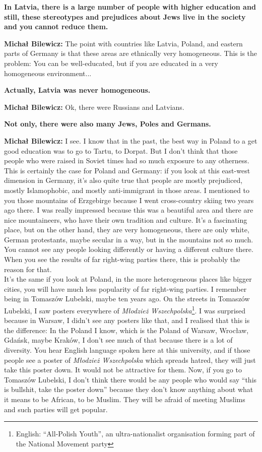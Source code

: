 \textbf{In Latvia, there is a large number of people with higher education and still, these stereotypes and prejudices about Jews live in the society and you cannot reduce them.} 

\textbf{Michał Bilewicz:} The point with countries like Latvia, Poland, and eastern parts of Germany is that these areas are ethnically very homogeneous. This is the problem: You can be well-educated, but if you are educated in a very homogeneous environment...

\textbf{Actually, Latvia was never homogeneous.}

\textbf{Michał Bilewicz:} Ok, there were Russians and Latvians.

\textbf{Not only, there were also many Jews, Poles and Germans.}

\textbf{Michał Bilewicz:} I see. I know that in the past, the best way in Poland to a get good education was to go to Tartu, to Dorpat. But I don’t think that those people who were raised in Soviet times had so much exposure to any otherness. This is certainly the case for Poland and Germany: if you look at this east-west dimension in Germany, it’s also quite true that people are mostly prejudiced, mostly Islamophobic, and mostly anti-immigrant in those areas. I mentioned to you those mountains of Erzgebirge because I went cross-country skiing two years ago there. I was really impressed because this was a beautiful area and there are nice mountaineers, who have their own tradition and culture. It’s a fascinating place, but on the other hand, they are very homogeneous, there are only white, German protestants, maybe secular in a way, but in the mountains not so much. You cannot see any people looking differently or having a different culture there. When you see the results of far right-wing parties there, this is probably the reason for that.\\
It's the same if you look at Poland, in the more heterogeneous places like bigger cities, you will have much less popularity of far right-wing parties. I remember being in Tomaszów Lubelski, maybe ten years ago. On the streets in Tomaszów Lubelski, I saw posters everywhere of \textit{Młodzież Wszechpolska}\footnote{English: ``All-Polish Youth'', an ultra-nationalist organisation forming part of the National Movement party}. I was surprised because in Warsaw, I didn’t see any posters like that, and I realised that this is the difference: In the Poland I know, which is the Poland of Warsaw, Wrocław, Gdańsk, maybe Kraków, I don’t see much of that because there is a lot of diversity. You hear English language spoken here at this university, and if those people see a poster of \textit{Młodzież Wszechpolska} which spreads hatred, they will just take this poster down. It would not be attractive for them. Now, if you go to Tomaszów Lubelski, I don’t think there would be any people who would say ``this is bullshit, take the poster down'' because they don’t know anything about what it means to be African, to be Muslim. They will be afraid of meeting Muslims and such parties will get popular.

